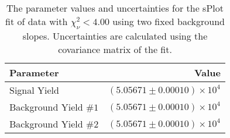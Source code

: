 
\begin{table}[ht]
    \begin{center}
        \begin{tabular}{lr}\toprule
            Parameter & Value \\\midrule
            Signal Yield & $(5.05671 \pm 0.00010) \times 10^{4}$ \\
            Background Yield $\#1$ & $(5.05671 \pm 0.00010) \times 10^{4}$ \\
            Background Yield $\#2$ & $(5.05671 \pm 0.00010) \times 10^{4}$ \\\bottomrule
        \end{tabular}
        \caption{The parameter values and uncertainties for the sPlot fit of data with $\chi^2_\nu < 4.00$ using two fixed background slopes. Uncertainties are calculated using the covariance matrix of the fit.}\label{tab:splot-fit-results-chisqdof-4.00-fixed-2}
    \end{center}
\end{table}
